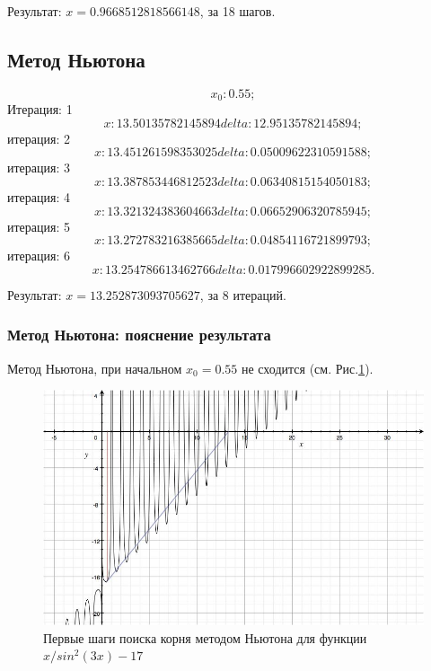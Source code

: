 \documentclass{article}
\begin{document}
Результат: $x = 0.9668512818566148$, за 18 шагов.

\subsection{Метод Ньютона}
\begin{displaymath}
  x_{0}: 0.55;
\end{displaymath}
Итерация: 1
\begin{displaymath}
  x: 13.50135782145894  delta: 12.95135782145894;
\end{displaymath}
итерация: 2
\begin{displaymath}
  x: 13.451261598353025  delta: 0.05009622310591588;
\end{displaymath}
итерация: 3
\begin{displaymath}
  x: 13.387853446812523  delta: 0.06340815154050183;
\end{displaymath}
итерация: 4
\begin{displaymath}
  x: 13.321324383604663  delta: 0.06652906320785945;
\end{displaymath}
итерация: 5
\begin{displaymath}
  x: 13.272783216385665  delta: 0.04854116721899793;
\end{displaymath}
итерация: 6
\begin{displaymath}
  x: 13.254786613462766  delta: 0.017996602922899285.
\end{displaymath}

Результат: $x = 13.252873093705627$, за 8 итераций.
\subsubsection{Метод Ньютона: пояснение результата}
  Метод Ньютона, при начальном $x_{0} = 0.55$ не сходится (см.
  Рис.\ref{equ_newton_img}).
  \begin{figure}[b]
    \includegraphics[width=13cm]{equations_newton.png}
    \caption{Первые шаги поиска корня методом Ньютона для функции $x/sin^2(3x)
    - 17$}
    \label{equ_newton_img}
  \end{figure}
\end{document}

